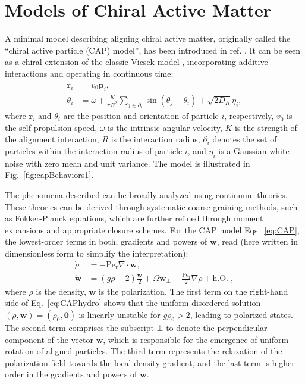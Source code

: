 \documentclass[a4paper, amsfonts, amssymb, amsmath, reprint, showkeys, showpacs, nofootinbib, twoside]{revtex4-2}
\begin{document}
\section{\label{sec:chirality}Models of Chiral Active Matter}
A minimal model describing aligning chiral active matter, originally called the “chiral active particle (CAP) model”, has been introduced in ref. \cite{PhysRevLett.119.058002}. It can be seen as a chiral extension of the classic Vicsek model \cite{PhysRevLett.75.1226}, incorporating additive interactions and operating in continuous time:
\begin{subequations}
    \label{eq:CAP}
    \begin{align}
        \dot{\mathbf{r}}_i&=v_0\mathbf{p}_i,\quad\\
        \dot{\theta}_i&=\omega +\frac{K}{\pi R^2}\sum_{j\in \partial _i}\sin(\theta _j-\theta _i)+\sqrt{2D_R}\eta _i,
    \end{align}
\end{subequations}
where $\mathbf{r}_i$ and $\theta _i$ are the position and orientation of particle $i$, respectively, $v_0$ is the self-propulsion speed, $\omega$ is the intrinsic angular velocity, $K$ is the strength of the alignment interaction, $R$ is the interaction radius, $\partial _i$ denotes the set of particles within the interaction radius of particle $i$, and $\eta _i$ is a Gaussian white noise with zero mean and unit variance. The model is illustrated in Fig.~\ref{fig:capBehaviors1}.

The phenomena described can be broadly analyzed using continuum theories. These theories can be derived through systematic coarse-graining methods, such as Fokker-Planck equations, which are further refined through moment expansions and appropriate closure schemes. For the CAP model Eqs.~\eqref{eq:CAP}, the lowest-order terms in both, gradients and powers of $\mathbf{w}$, read (here written in dimensionless form to simplify the interpretation):
\begin{subequations}
    \begin{align}
        \dot{\rho}&=-\mathrm{Pe}_{\mathrm{r}}\nabla \cdot \mathbf{w},\\
        \dot{\mathbf{w}}&=(g\rho -2)\frac{\mathbf{w}}{2}+\Omega \mathbf{w}_{\bot}-\frac{\mathrm{Pe}_{\mathrm{r}}}{2}\nabla \rho +\mathrm{h}.\mathrm{O}.\;,\label{eq:CAPhydro}
    \end{align}
\end{subequations}
where $\rho$ is the density, $\mathbf{w}$ is the polarization.
The first term on the right-hand side of Eq.~\eqref{eq:CAPhydro} shows that the uniform disordered solution $\left(\rho,\mathbf{w}\right)=\left(\rho_0,\mathbf{0}\right)$ is linearly unstable for $g\rho_0>2$, leading to polarized states. The second term comprises the subscript $\bot$ to denote the perpendicular component of the vector $\mathbf{w}$, which is responsible for the emergence of uniform rotation of aligned particles. The third term represents the relaxation of the polarization field towards the local density gradient, and the last term is higher-order in the gradients and powers of $\mathbf{w}$.
\end{document}
